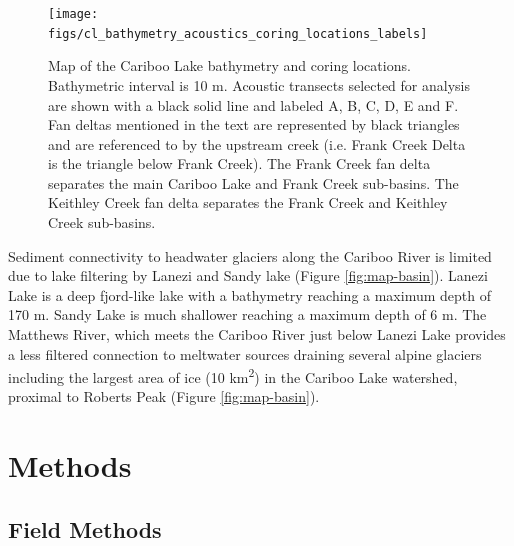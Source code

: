 \documentclass[Royal,times,doublespace,sageh]{sagej}
\begin{document}
\begin{figure}

{\centering \texttt{[image: figs/cl\_bathymetry\_acoustics\_coring\_locations\_labels]} 

}

\caption{Map of the Cariboo Lake bathymetry and coring locations. Bathymetric interval is 10 m. Acoustic transects selected for analysis are shown with a black solid line and labeled A, B, C, D, E and F. Fan deltas mentioned in the text are represented by black triangles and are referenced to by the upstream creek (i.e. Frank Creek Delta is the triangle below Frank Creek). The Frank Creek fan delta separates the main Cariboo Lake and Frank Creek sub-basins. The Keithley Creek fan delta separates the Frank Creek and Keithley Creek sub-basins.\label{fig:map-lake}}\label{fig:map-lake}
\end{figure}

Sediment connectivity to headwater glaciers along the Cariboo River is
limited due to lake filtering by Lanezi and Sandy lake (Figure
\ref{fig:map-basin}). Lanezi Lake is a deep fjord-like lake with a
bathymetry reaching a maximum depth of 170 m. Sandy Lake is much
shallower reaching a maximum depth of 6 m. The Matthews River, which
meets the Cariboo River just below Lanezi Lake provides a less filtered
connection to meltwater sources draining several alpine glaciers
including the largest area of ice (10 km\textsuperscript{2}) in the
Cariboo Lake watershed, proximal to Roberts Peak (Figure
\ref{fig:map-basin}).

\hypertarget{methods}{%
\section{Methods}\label{methods}}

\hypertarget{field-methods}{%
\subsection{Field Methods}\label{field-methods}}
\end{document}
